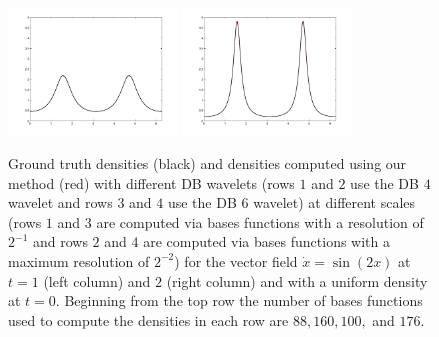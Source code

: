 \documentclass[letterpaper, 12 pt]{amsart}
\newcommand{\R}{\mathbb{R}}
\begin{document}
\begin{figure}[p]
  \includegraphics[width=0.4\textwidth]{./images/S1Wavelet_sf6nBases176scale2T1.pdf}
  \includegraphics[width=0.4\textwidth]{./images/S1Wavelet_sf6nBases176scale2T2.pdf}
  \caption{Ground truth densities (black) and densities computed using our method (red) with different DB wavelets (rows $1$ and $2$ use the DB $4$ wavelet and rows $3$ and $4$ use the DB $6$ wavelet) at different scales (rows $1$ and $3$ are computed via bases functions with a resolution of $2^{-1}$ and rows $2$ and $4$ are computed via bases functions with a maximum resolution of $2^{-2}$) for the vector field $\dot{x}=\sin(2x)$ at $t=1$ (left column) and $2$ (right column) and with a uniform density at $t=0$. Beginning from the top row the number of bases functions used to compute the densities in each row are $88,160,100,$ and $176$.}
  \label{fig:one_dim_system_wavelet}
\end{figure}
\pagebreak
\end{document}
